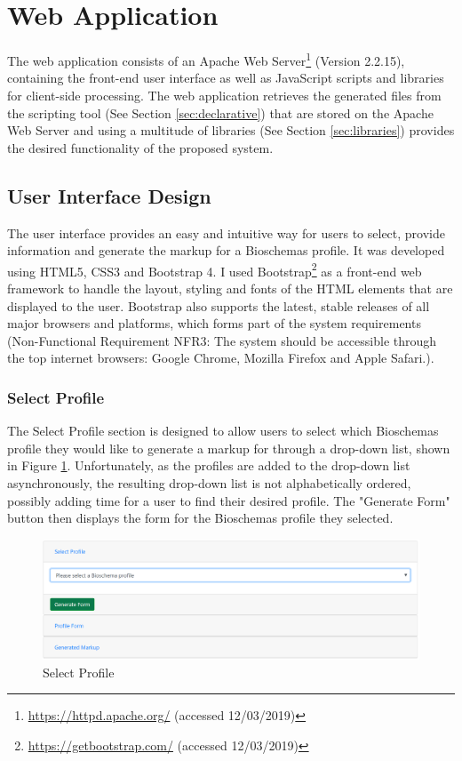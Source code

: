 \newpage
{
\section{Web Application}\label{sec:webapplication}
The web application consists of an Apache Web Server\footnote{\url{https://httpd.apache.org/} (accessed 12/03/2019)} (Version 2.2.15), containing the front-end user interface as well as JavaScript scripts and libraries for client-side processing. The web application retrieves the generated files from the scripting tool (See Section \ref{sec:declarative}) that are stored on the Apache Web Server and using a multitude of libraries (See Section \ref{sec:libraries}) provides the desired functionality of the proposed system. 

\subsection{User Interface Design}\label{sec:userInterface}
The user interface provides an easy and intuitive way for users to select, provide information and generate the markup for a Bioschemas profile. It was developed using HTML5, CSS3 and Bootstrap 4. I used Bootstrap\footnote{\url{https://getbootstrap.com/} (accessed 12/03/2019)} as a front-end web framework to handle the layout, styling and fonts of the HTML elements that are displayed to the user. Bootstrap also supports the latest, stable releases of all major browsers and platforms, which forms part of the system requirements (Non-Functional Requirement NFR3: The system should be accessible through the top internet browsers: Google Chrome, Mozilla Firefox and Apple Safari.).

\subsubsection*{Select Profile}
The Select Profile section is designed to allow users to select which Bioschemas profile they would like to generate a markup for through a drop-down list, shown in Figure \ref{fig:selectProfle}. Unfortunately, as the profiles are added to the drop-down list asynchronously, the resulting drop-down list is not alphabetically ordered, possibly adding time for a user to find their desired profile. The "Generate Form" button then displays the form for the Bioschemas profile they selected.\newline

\begin{figure}[!h]
 \centering\includegraphics[scale=0.65]{images/system/generateForm.PNG}
   \caption{Select Profile}
   \label{fig:selectProfle}
\end{figure}

}

